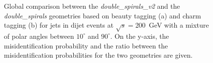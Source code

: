 \begin{figure}[H]
\begin{subfigure}[b]{0.5\textwidth}
    \caption{}
    \label{}
  \end{subfigure}
  \caption{Global comparison between the \textit{double\_spirals\_v2} and
    the \textit{double\_spirals} geometries based on beauty tagging (a)
    and charm tagging (b) for jets in dijet events at $\sqrt{s}=$200~GeV with a
    mixture of polar angles between $10^{\circ}$ and
    $90^{\circ}$. On the y-axis, the misidentification probability
    and the ratio between the misidentification probabilities for
    the two geometries are given.}\label{fig:heavy_200}
\end{figure}


